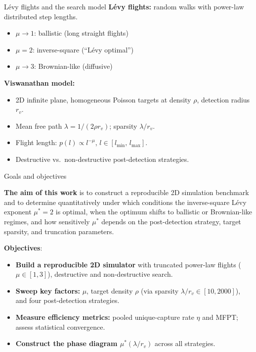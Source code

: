 \documentclass[aspectratio=169,xcolor=dvipsnames]{beamer}
\begin{document}
\begin{frame}{L\'evy flights and the search model}
\textbf{L\'evy flights:} random walks with power-law distributed step lengths.
\begin{itemize}
    \item $\mu \to 1$: ballistic (long straight flights)
    \item $\mu = 2$: inverse-square (``L\'evy optimal'')
    \item $\mu \to 3$: Brownian-like (diffusive)
\end{itemize}
\vspace{6pt}
\textbf{Viswanathan model:}
\begin{itemize}
    \item 2D infinite plane, homogeneous Poisson targets at density $\rho$, detection radius $r_v$.
    \item Mean free path $\lambda = 1/(2\rho r_v)$; sparsity $\lambda/r_v$.
    \item Flight length: $p(l) \propto l^{-\mu}$, \quad $l \in [l_{\min},\, l_{\max}]$.
    \item Destructive vs.\ non-destructive post-detection strategies.
\end{itemize}
\end{frame}

\begin{frame}{Goals and objectives}
\begin{block}{}
    \centering
    \textbf{The aim of this work} is to construct a reproducible 2D simulation benchmark and to determine quantitatively under which conditions the inverse-square L\'evy exponent $\mu^* = 2$ is optimal, when the optimum shifts to ballistic or Brownian-like regimes, and how sensitively $\mu^*$ depends on the post-detection strategy, target sparsity, and truncation parameters.
\end{block}
\textbf{Objectives}:
\begin{itemize}
    \item \textbf{Build a reproducible 2D simulator} with truncated power-law flights ($\mu \in [1, 3]$), destructive and non-destructive search.

\item \textbf{Sweep key factors:} $\mu$, target density $\rho$ (via sparsity $\lambda/r_v \in [10, 2000]$), and four post-detection strategies.

\item \textbf{Measure efficiency metrics:} pooled unique-capture rate $\eta$ and MFPT; assess statistical convergence.

\item \textbf{Construct the phase diagram $\mu^*(\lambda/r_v)$} across all strategies.
\end{itemize}
\end{frame}
\end{document}
